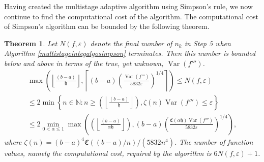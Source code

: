 \documentclass{iitthesis}
\DeclareMathOperator{\Var}{Var}
\newtheorem{theorem}{Theorem}
\theoremstyle{definition}
\theoremstyle{remark}
\begin{document}
Having created the multistage adaptive algorithm using Simpson's rule, we now continue to find the computational cost of the algorithm. The computational cost of Simpson's algorithm can be bounded by the following theorem.
\begin{theorem}\label{uppbndcostSimp}
    Let $N(f,\varepsilon)$ denote the final number of $n_k$ in Step 5 when Algorithm \ref{multistageintegalgosimpson} terminates. Then this number is bounded below and above in terms of the true, yet unknown, $\Var(f''')$.
    \begin{multline}\label{uppbndcostineqsim}
        \max\left(\left\lfloor\frac{(b-a)}{\mathfrak{h}}\right\rfloor,\left\lceil(b-a)\left(\frac{\Var(f''')}{5832\varepsilon}\right)^{1/4}\right\rceil\right)\leq N(f,\varepsilon)\\ \leq 2\min\left\{n\in\mathbb{N}:n\geq\left(\left\lfloor\frac{(b-a)}{\mathfrak{h}}\right\rfloor\right),\zeta(n)\Var(f''')\leq\varepsilon\right\}\\ \leq 2\min_{0<\alpha\leq1}\max\left(\left(\left\lfloor\frac{(b-a)}{\alpha\mathfrak{h}}\right\rfloor\right),(b-a)\left(\frac{\mathfrak{C}(\alpha\mathfrak{h})\Var(f''')}{5832\varepsilon}\right)^{1/4}\right),
    \end{multline}
    where $\zeta(n)=(b-a)^4\mathfrak{C}((b-a)/n)/(5832n^4)$. The number of function values, namely the computational cost, required by the algorithm is $6N(f,\varepsilon)+1$.
\end{theorem}
\end{document}
